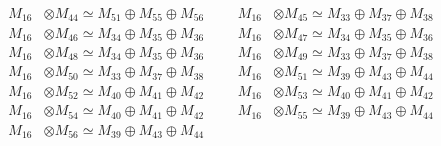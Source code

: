 \begin{align*}
M_{16} &\otimes M_{44} \simeq M_{51} \oplus M_{55} \oplus M_{56} &&& M_{16} &\otimes M_{45} \simeq M_{33} \oplus M_{37} \oplus M_{38}\\
M_{16} &\otimes M_{46} \simeq M_{34} \oplus M_{35} \oplus M_{36} &&& M_{16} &\otimes M_{47} \simeq M_{34} \oplus M_{35} \oplus M_{36}\\
M_{16} &\otimes M_{48} \simeq M_{34} \oplus M_{35} \oplus M_{36} &&& M_{16} &\otimes M_{49} \simeq M_{33} \oplus M_{37} \oplus M_{38}\\
M_{16} &\otimes M_{50} \simeq M_{33} \oplus M_{37} \oplus M_{38} &&& M_{16} &\otimes M_{51} \simeq M_{39} \oplus M_{43} \oplus M_{44}\\
M_{16} &\otimes M_{52} \simeq M_{40} \oplus M_{41} \oplus M_{42} &&& M_{16} &\otimes M_{53} \simeq M_{40} \oplus M_{41} \oplus M_{42}\\
M_{16} &\otimes M_{54} \simeq M_{40} \oplus M_{41} \oplus M_{42} &&& M_{16} &\otimes M_{55} \simeq M_{39} \oplus M_{43} \oplus M_{44}\\
M_{16} &\otimes M_{56} \simeq M_{39} \oplus M_{43} \oplus M_{44}
\end{align*}

